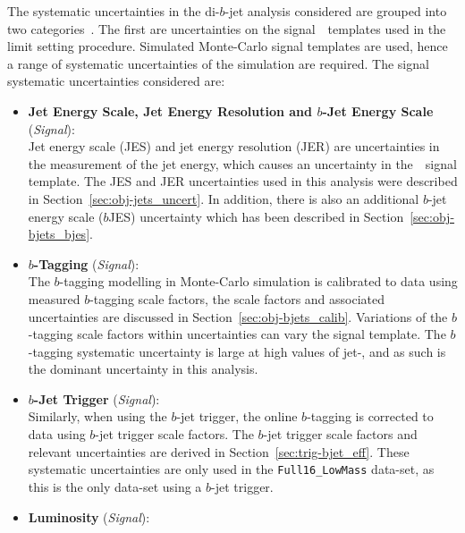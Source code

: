 The systematic uncertainties in the di-$b$-jet analysis considered are grouped into two categories~\cite{dibjet-ichep_conf}.
The first are
uncertainties on the signal~\mjj~templates used in the limit setting procedure.
Simulated Monte-Carlo signal templates are used,
hence a range of systematic uncertainties of the simulation are required.
The signal systematic uncertainties considered are:
\begin{itemize}[leftmargin=*]
\item\textbf{Jet Energy Scale, Jet Energy Resolution  and $b$-Jet Energy Scale} \hspace{1mm} (\textit{Signal}):\\
  Jet energy scale (JES) and jet energy resolution (JER) are uncertainties in the measurement of the jet energy,
  which causes an uncertainty in the~\mjj~signal template.
  The JES and JER uncertainties used in this analysis were described in Section~\ref{sec:obj-jets_uncert}.
  In addition, there is also an additional $b$-jet energy scale ($b$JES) uncertainty which
  has been described in Section~\ref{sec:obj-bjets_bjes}.
  \vspace{0.5em}
\item\textbf{$b$-Tagging} \hspace{1mm} (\textit{Signal}):\\
  The $b$-tagging modelling in Monte-Carlo simulation is calibrated to data using measured $b$-tagging scale factors,
  the scale factors and associated uncertainties are discussed in Section~\ref{sec:obj-bjets_calib}.
  Variations of the $b$-tagging scale factors within uncertainties can vary the signal template.
  The $b$-tagging systematic uncertainty is large at high values of jet-\pT, and as such is the dominant uncertainty in this analysis.
  \vspace{0.5em}
\item\textbf{$b$-Jet Trigger} \hspace{1mm} (\textit{Signal}):\\
  Similarly, when using the $b$-jet trigger, the online $b$-tagging is corrected to data using
  $b$-jet trigger scale factors.
  The $b$-jet trigger scale factors and relevant uncertainties are derived in Section~\ref{sec:trig-bjet_eff}.
  These systematic uncertainties are only used in the \verb|Full16_LowMass| data-set, as this is the only data-set using a $b$-jet trigger.
  \vspace{0.5em}
\item\textbf{Luminosity} \hspace{1mm} (\textit{Signal}):\\

\end{itemize}
